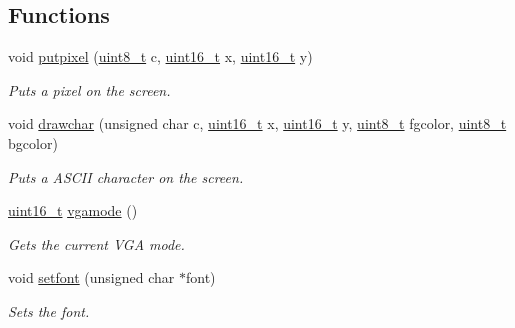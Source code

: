 \subsection*{Functions}
\begin{DoxyCompactItemize}
\item 
void \hyperlink{a00017_ab17a69b465efb1ebe54a6a2e5d7b7ce8_ab17a69b465efb1ebe54a6a2e5d7b7ce8}{putpixel} (\hyperlink{a00092_aba7bc1797add20fe3efdf37ced1182c5_aba7bc1797add20fe3efdf37ced1182c5}{uint8\+\_\+t} c, \hyperlink{a00092_a273cf69d639a59973b6019625df33e30_a273cf69d639a59973b6019625df33e30}{uint16\+\_\+t} x, \hyperlink{a00092_a273cf69d639a59973b6019625df33e30_a273cf69d639a59973b6019625df33e30}{uint16\+\_\+t} y)
\begin{DoxyCompactList}\small\item\em Puts a pixel on the screen. \end{DoxyCompactList}\item 
void \hyperlink{a00017_a2c8df7a20b47341b70d97a7ff21d86ea_a2c8df7a20b47341b70d97a7ff21d86ea}{drawchar} (unsigned char c, \hyperlink{a00092_a273cf69d639a59973b6019625df33e30_a273cf69d639a59973b6019625df33e30}{uint16\+\_\+t} x, \hyperlink{a00092_a273cf69d639a59973b6019625df33e30_a273cf69d639a59973b6019625df33e30}{uint16\+\_\+t} y, \hyperlink{a00092_aba7bc1797add20fe3efdf37ced1182c5_aba7bc1797add20fe3efdf37ced1182c5}{uint8\+\_\+t} fgcolor, \hyperlink{a00092_aba7bc1797add20fe3efdf37ced1182c5_aba7bc1797add20fe3efdf37ced1182c5}{uint8\+\_\+t} bgcolor)
\begin{DoxyCompactList}\small\item\em Puts a A\+S\+C\+II character on the screen. \end{DoxyCompactList}\item 
\hyperlink{a00092_a273cf69d639a59973b6019625df33e30_a273cf69d639a59973b6019625df33e30}{uint16\+\_\+t} \hyperlink{a00017_af6d170c9401ea8f94d4c5cf09347cca7_af6d170c9401ea8f94d4c5cf09347cca7}{vgamode} ()
\begin{DoxyCompactList}\small\item\em Gets the current V\+GA mode. \end{DoxyCompactList}\item 
void \hyperlink{a00017_abb01dc16ea34f0a6de3d10d732b6c536_abb01dc16ea34f0a6de3d10d732b6c536}{setfont} (unsigned char $\ast$font)
\begin{DoxyCompactList}\small\item\em Sets the font. \end{DoxyCompactList}\end{DoxyCompactItemize}



